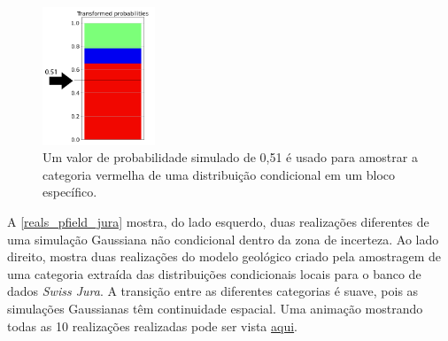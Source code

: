 \begin{figure}[H]
	\caption{\label{samplig_from_dist} Um valor de probabilidade simulado de 0,51 é usado para amostrar a categoria vermelha de uma distribuição condicional em um bloco específico.}
	\centering
		\includegraphics[width=0.3\textwidth]{capitulo_3/imagens/sampling_from_dist.png}
\end{figure}

A \autoref{reals_pfield_jura} mostra, do lado esquerdo, duas realizações diferentes de uma simulação Gaussiana não condicional dentro da zona de incerteza. Ao lado direito, mostra duas realizações do modelo geológico criado pela amostragem de uma categoria extraída das distribuições condicionais locais para o banco de dados \textit{Swiss Jura}. A transição entre as diferentes categorias é suave, pois as simulações Gaussianas têm continuidade espacial. Uma animação mostrando todas as 10 realizações realizadas pode ser vista \href{https://github.com/robertorolo/assessing_geological_model_uncertainty_with_probability_fields/blob/main/jura_gif.gif}{aqui}.

